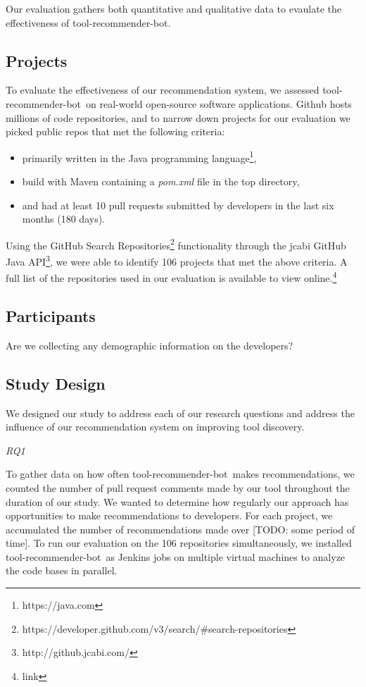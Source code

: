 \documentclass[conference]{IEEEtran}
\newcommand{\tool}{tool-recommender-bot}
\newcommand{\pseudosubsection}[1]{\vspace{2mm} {\it #1}}
\begin{document}
Our evaluation gathers both quantitative and qualitative data to evaulate the effectiveness of \tool.

\subsection{Projects}

To evaluate the effectiveness of our recommendation system, we assessed \tool~on real-world open-source software applications. Github hosts millions of code repositories, and to narrow down projects for our evaluation we picked public repos that met the following criteria:

\begin{itemize}
\item primarily written in the Java programming language\footnote{https://java.com},
\item build with Maven containing a \textit{pom.xml} file in the top directory,
\item and had at least 10 pull requests submitted by developers in the last six months (180 days).
\end{itemize}

Using the GitHub Search Repositories\footnote{https://developer.github.com/v3/search/\#search-repositories} functionality through the jcabi GitHub Java API\footnote{http://github.jcabi.com/}, we were able to identify 106 projects that met the above criteria. A full list of the repositories used in our evaluation is available to view online.\footnote{link}
\subsection{Participants}

Are we collecting any demographic information on the developers?

\subsection{Study Design}

We designed our study to address each of our research questions and address the influence of our recommendation system on improving tool discovery.

\pseudosubsection{RQ1}

To gather data on how often \tool~makes recommendations, we counted the number of pull request comments made by our tool throughout the duration of our study. We wanted to determine how regularly our approach has opportunities to make recommendations to developers. For each project, we accumulated the number of recommendations made over [TODO: some period of time]. To run our evaluation on the 106 repositories simultaneously, we installed \tool~as Jenkins jobs on multiple virtual machines to analyze the code bases in parallel. 
\end{document}
